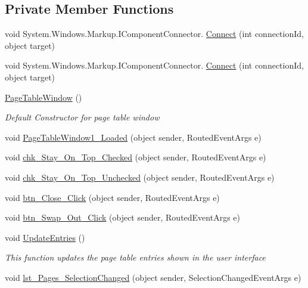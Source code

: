 \subsection*{Private Member Functions}
\begin{DoxyCompactItemize}
\item 
void System.\+Windows.\+Markup.\+I\+Component\+Connector. \hyperlink{class_c_p_u___o_s___simulator_1_1_page_table_window_a5843f37edba076f17d15fe9f9f20d930}{Connect} (int connection\+Id, object target)
\item 
void System.\+Windows.\+Markup.\+I\+Component\+Connector. \hyperlink{class_c_p_u___o_s___simulator_1_1_page_table_window_a5843f37edba076f17d15fe9f9f20d930}{Connect} (int connection\+Id, object target)
\item 
\hyperlink{class_c_p_u___o_s___simulator_1_1_page_table_window_a9ddde0b8d78abd882007a4d919e5a082}{Page\+Table\+Window} ()
\begin{DoxyCompactList}\small\item\em Default Constructor for page table window \end{DoxyCompactList}\item 
void \hyperlink{class_c_p_u___o_s___simulator_1_1_page_table_window_a32fcbb5d7acdefedbf7b81194f046f40}{Page\+Table\+Window1\+\_\+\+Loaded} (object sender, Routed\+Event\+Args e)
\item 
void \hyperlink{class_c_p_u___o_s___simulator_1_1_page_table_window_a4fca878351d58351729a016149ab037e}{chk\+\_\+\+Stay\+\_\+\+On\+\_\+\+Top\+\_\+\+Checked} (object sender, Routed\+Event\+Args e)
\item 
void \hyperlink{class_c_p_u___o_s___simulator_1_1_page_table_window_a7d678a6670baff37546ea625ae36a63c}{chk\+\_\+\+Stay\+\_\+\+On\+\_\+\+Top\+\_\+\+Unchecked} (object sender, Routed\+Event\+Args e)
\item 
void \hyperlink{class_c_p_u___o_s___simulator_1_1_page_table_window_ae072e4c12e228104c4e3b201c1c9d812}{btn\+\_\+\+Close\+\_\+\+Click} (object sender, Routed\+Event\+Args e)
\item 
void \hyperlink{class_c_p_u___o_s___simulator_1_1_page_table_window_a0a18aa563b2185c73dac319969a24c43}{btn\+\_\+\+Swap\+\_\+\+Out\+\_\+\+Click} (object sender, Routed\+Event\+Args e)
\item 
void \hyperlink{class_c_p_u___o_s___simulator_1_1_page_table_window_aea28126046f84b8a2cced2d22f21804d}{Update\+Entries} ()
\begin{DoxyCompactList}\small\item\em This function updates the page table entries shown in the user interface \end{DoxyCompactList}\item 
void \hyperlink{class_c_p_u___o_s___simulator_1_1_page_table_window_ab6e40cd99ff3eedb1719774c9a123650}{lst\+\_\+\+Pages\+\_\+\+Selection\+Changed} (object sender, Selection\+Changed\+Event\+Args e)
\end{DoxyCompactItemize}
